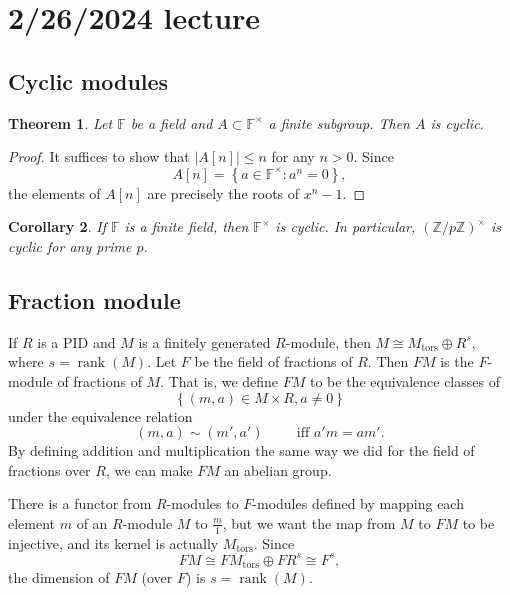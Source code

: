 \documentclass[12pt]{article}
\newtheorem{thm}{Theorem}[section]
\newtheorem{cor}[thm]{Corollary}
\begin{document}
\section{2/26/2024 lecture}
\subsection{Cyclic modules}
\begin{thm}\label{cyclic}
    Let $\mathbb{F}$ be a field and $A \subset \mathbb{F}^\times$ a finite subgroup. Then $A$ is cyclic.
\end{thm}
\begin{proof}
    It suffices to show that $|A[n]| \leq n$ for any $n > 0$. Since
    \[ A[n] = \left\{ a \in \mathbb{F}^\times : a^n=0 \right\}, \]
    the elements of $A[n]$ are precisely the roots of $x^n-1$.
\end{proof}
\begin{cor}\label{finitefieldcyclic}
    If $\mathbb{F}$ is a finite field, then $\mathbb{F}^\times$ is cyclic. In particular, $(\mathbb{Z}/p\mathbb{Z})^\times$ is cyclic for any prime $p$.
\end{cor}
\subsection{Fraction module}
If $R$ is a PID and $M$ is a finitely generated $R$-module, then $M \cong M_\mathrm{tors} \oplus R^s$, where $s = \operatorname{rank}(M)$. Let $F$ be the field of fractions of $R$. Then $FM$ is the $F$-module of fractions of $M$. That is, we define $FM$ to be the equivalence classes of
\[ \left\{ (m,a) \in M \times R, a \neq 0 \right\} \]
under the equivalence relation
\[ (m,a) \sim (m',a') \hspace{1cm} \text{iff $a'm=am'$}. \]
By defining addition and multiplication the same way we did for the field of fractions over $R$, we can make $FM$ an abelian group.
\par
There is a functor from $R$-modules to $F$-modules defined by mapping each element $m$ of an $R$-module $M$ to $\frac{m}{1}$, but we want the map from $M$ to $FM$ to be injective, and its kernel is actually $M_\mathrm{tors}$. Since
\[ FM \cong FM_\mathrm{tors} \oplus FR^s \cong F^s, \]
the dimension of $FM$ (over $F$) is $s = \operatorname{rank}(M)$.
\end{document}
